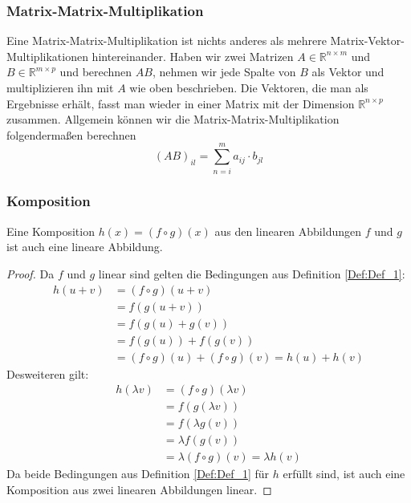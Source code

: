 \subsubsection{Matrix-Matrix-Multiplikation}
Eine Matrix-Matrix-Multiplikation ist nichts anderes als mehrere Matrix-Vektor-Multiplikationen hintereinander. Haben wir zwei Matrizen $A \in \mathbb{R}^{n \times m}$ und $B \in \mathbb{R}^{m \times p}$ und berechnen $AB$, nehmen wir jede Spalte von $B$ als Vektor und multiplizieren ihn mit $A$ wie oben beschrieben. Die Vektoren, die man als Ergebnisse erhält, fasst man wieder in einer Matrix mit der Dimension $\mathbb{R}^{n \times p}$ zusammen. Allgemein können wir die Matrix-Matrix-Multiplikation folgendermaßen berechnen
\begin{equation*}
	(AB)_{il} = \sum_{n=i}^{m}a_{ij} \cdot b_{jl}
\end{equation*}

\subsubsection{Komposition}
\begin{Thm}
Eine Komposition $h(x) = (f \circ g)(x)$ aus den linearen Abbildungen $f$ und $g$ ist auch eine lineare Abbildung.
\end{Thm}

\begin{proof}
Da $f$ und $g$ linear sind gelten die Bedingungen aus Definition \ref{Def:Def_1}:
\begin{align*}
	h(u+v) &= (f \circ g)(u+v)\\
	&= f(g(u+v))\\
	&= f(g(u)+g(v))\\
	&= f(g(u)) + f(g(v))\\
	&= (f\circ g)(u) + (f\circ g)(v) = h(u) + h(v)
\end{align*}
Desweiteren gilt:
\begin{align*}
	h(\lambda v) &= (f \circ g)(\lambda v)\\
	&=f(g(\lambda v))\\
	&= f(\lambda g(v))\\
	&=\lambda f(g(v))\\
	&=\lambda (f \circ g)(v) = \lambda h(v)
\end{align*}
Da beide Bedingungen aus Definition \ref{Def:Def_1} für $h$ erfüllt sind, ist auch eine Komposition aus zwei linearen Abbildungen linear.
\end{proof}

